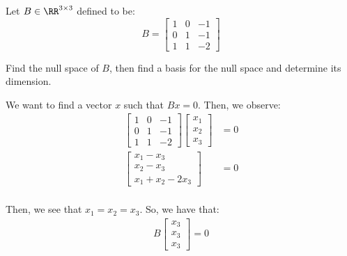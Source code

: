 \documentclass[openany]{book}
\begin{document}
\begin{hw}
	Let $B \in \RR^{3 \times 3}$ defined to be:
	\begin{equation*}
		B = \begin{bmatrix}
			1 & 0 & -1 \\ 0 & 1 & -1 \\ 1 & 1 & -2
		\end{bmatrix}
	\end{equation*}

	Find the null space of $B$, then find a basis for the null space and determine its dimension.
\end{hw}
\begin{solution}
	We want to find a vector $x$ such that $Bx = 0$. Then, we observe:
	\begin{align*}
		\begin{bmatrix}
			1 & 0 & -1 \\ 0 & 1 & -1 \\ 1 & 1 & -2
		\end{bmatrix} \begin{bmatrix}
		x_1 \\ x_2 \\ x_3
	\end{bmatrix} &= 0 \\
	\begin{bmatrix}
		x_1 - x_3 \\ x_2 - x_3 \\ x_1 + x_2 -2x_3
	\end{bmatrix} &= 0 \\
	\end{align*}

	Then, we see that $x_1 = x_2 = x_3$. So, we have that:
	\begin{align*}
		B \begin{bmatrix}
			x_3 \\ x_3 \\ x_3
		\end{bmatrix} = 0
	\end{align*}


\end{solution}
\end{document}
